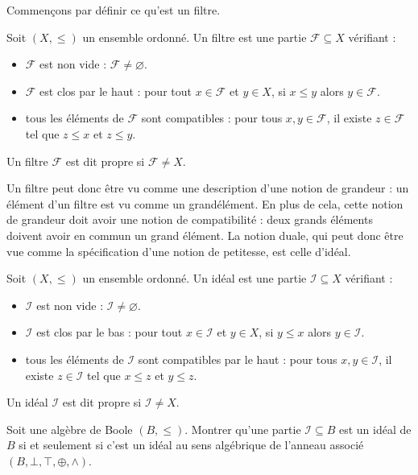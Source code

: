 Commençons par définir ce qu'est un filtre.

\begin{definition}[Filtre]
  Soit $(X,\leq)$ un ensemble ordonné. Un filtre est une partie
  $\mathcal F\subseteq X$ vérifiant :
  \begin{itemize}
  \item $\mathcal F$ est non vide : $\mathcal F \neq\varnothing$.
  \item $\mathcal F$ est clos par le haut : pour tout $x\in \mathcal F$ et
    $y\in X$, si $x\leq y$ alors $y\in \mathcal F$.
  \item tous les éléments de $\mathcal F$ sont compatibles : pour tous
    $x,y\in\mathcal F$, il existe $z\in\mathcal F$ tel que $z\leq x$ et
    $z\leq y$.
  \end{itemize}

  Un filtre $\mathcal F$ est dit propre si $\mathcal F \neq X$.
\end{definition}

Un filtre peut donc être vu comme une description d'une notion de grandeur :
un élément d'un filtre est vu comme un \og grand\fg élément. En plus de cela,
cette notion de grandeur doit avoir une notion de compatibilité : deux grands
éléments doivent avoir en commun un grand élément. La notion duale, qui peut
donc être vue comme la spécification d'une notion de petitesse, est celle
d'idéal.

\begin{definition}[Idéal]
  Soit $(X,\leq)$ un ensemble ordonné. Un idéal est une partie
  $\mathcal I \subseteq X$ vérifiant :
  \begin{itemize}
  \item $\mathcal I$ est non vide : $\mathcal I \neq\varnothing$.
  \item $\mathcal I$ est clos par le bas : pour tout $x\in \mathcal I$ et
    $y\in X$, si $y\leq x$ alors $y\in \mathcal I$.
  \item tous les éléments de $\mathcal I$ sont compatibles par le haut :
    pour tous $x,y\in \mathcal I$, il existe $z\in \mathcal I$ tel que
    $x\leq z$ et $y\leq z$.
  \end{itemize}

  Un idéal $\mathcal I$ est dit propre si $\mathcal I \neq X$.
\end{definition}

\begin{definition}
  Soit une algèbre de Boole $(B,\leq)$. Montrer qu'une partie
  $\mathcal I \subseteq B$ est un idéal de $B$ si et seulement si c'est un idéal
  au sens algébrique de l'anneau associé $(B,\bot,\top,\oplus,\land)$.
\end{definition}

